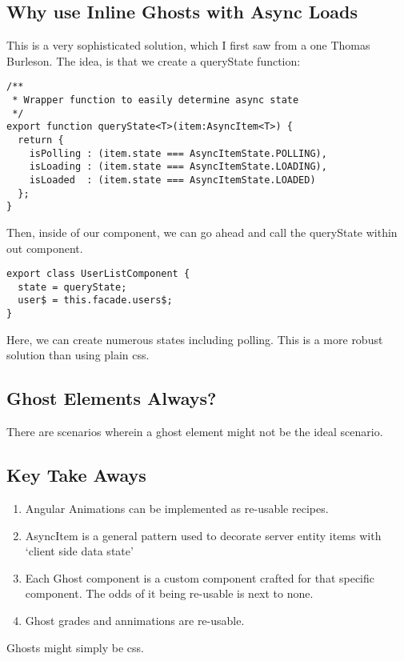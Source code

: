 \subsection{ Why use Inline Ghosts with Async Loads}
This is a very sophisticated solution, which I first saw from a one Thomas
Burleson. The idea, is that we create a queryState function:
\begin{lstlisting}
/**
 * Wrapper function to easily determine async state
 */
export function queryState<T>(item:AsyncItem<T>) {
  return {
    isPolling : (item.state === AsyncItemState.POLLING),
    isLoading : (item.state === AsyncItemState.LOADING),
    isLoaded  : (item.state === AsyncItemState.LOADED)
  };
}
\end{lstlisting}

Then, inside of our component, we can go ahead and call the queryState within
out component.

\begin{lstlisting}
export class UserListComponent {
  state = queryState;
  user$ = this.facade.users$;
}
\end{lstlisting}

Here, we can create numerous states including polling. This is a more robust
solution than using plain css.

\subsection{ Ghost Elements Always? }
There are scenarios wherein a ghost element might not be the ideal scenario.

\subsection{Key Take Aways}
\begin{enumerate}
  \item Angular Animations can be implemented as re-usable recipes.
  \item AsyncItem is a general pattern used to decorate server entity items with
  `client side data state'
  \item Each Ghost component is a custom component crafted for that specific
  component. The odds of it being re-usable is next to none.
  \item Ghost grades and annimations are re-usable.
\end{enumerate}

Ghosts might simply be css.
